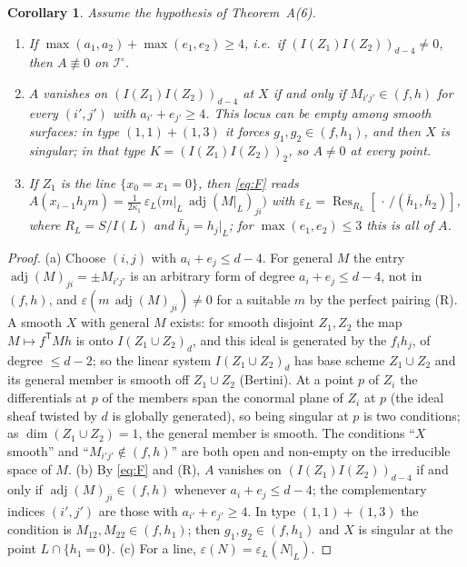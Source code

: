 \documentclass[11pt]{article}
\numberwithin{equation}{section}
\newtheorem{corollary}[theorem]{Corollary}
\theoremstyle{remark}
\newcommand{\cI}{\mathcal{I}}
\newcommand{\Res}{\operatorname{Res}}
\newcommand{\adj}{\operatorname{adj}}
\begin{document}
\begin{corollary}\label{cor:F}
Assume the hypothesis of Theorem~\textup{A(6)}.
\begin{enumerate}[label=\textup{(\alph*)}]
\item If $\max(a_1,a_2)+\max(e_1,e_2)\ge4$, i.e.\ if $(I(Z_1)I(Z_2))_{d-4}\neq0$, then $A\not\equiv0$ on
$\cI^\circ$.
\item $A$ vanishes on $(I(Z_1)I(Z_2))_{d-4}$ at $X$ if and only if $M_{i'j'}\in(f,h)$ for every $(i',j')$ with
$a_{i'}+e_{j'}\ge4$. This locus can be empty among smooth surfaces: in type $(1,1)+(1,3)$ it forces
$g_1,g_2\in(f,h_1)$, and then $X$ is singular; in that type $K=(I(Z_1)I(Z_2))_2$, so $A\neq0$ at every point.
\item If $Z_1$ is the line $\{x_0=x_1=0\}$, then \eqref{eq:F} reads
$A(x_{i-1}h_jm)=\frac1{2\kappa_1}\,\varepsilon_L\bigl(m|_L\,\adj(M|_L)_{ji}\bigr)$ with
$\varepsilon_L=\Res_{R_L}[\,\cdot\,/(\bar h_1,\bar h_2)]$, where $R_L=S/I(L)$ and $\bar h_j=h_j|_L$; for
$\max(e_1,e_2)\le3$ this is all of $A$.
\end{enumerate}
\end{corollary}
\begin{proof}
(a) Choose $(i,j)$ with $a_i+e_j\le d-4$. For general $M$ the entry $\adj(M)_{ji}=\pm M_{i'j'}$ is an arbitrary
form of degree $a_i+e_j\le d-4$, not in $(f,h)$, and $\varepsilon(m\,\adj(M)_{ji})\neq0$ for a suitable $m$ by
the perfect pairing (R). A smooth $X$ with general $M$ exists: for smooth disjoint $Z_1,Z_2$ the map
$M\mapsto f^{\mathsf T}Mh$ is onto $I(Z_1\cup Z_2)_d$, and this ideal is generated by the $f_ih_j$, of degree
$\le d-2$; so the linear system $I(Z_1\cup Z_2)_d$ has base scheme $Z_1\cup Z_2$ and its general member is smooth
off $Z_1\cup Z_2$ (Bertini). At a point $p$ of $Z_i$ the differentials at $p$ of the members span the conormal
plane of $Z_i$ at $p$ (the ideal sheaf twisted by $d$ is globally generated), so being singular at $p$ is two
conditions; as $\dim(Z_1\cup Z_2)=1$, the general member is smooth. The conditions ``$X$ smooth'' and
``$M_{i'j'}\notin(f,h)$'' are both open and non-empty on the irreducible space of $M$. (b) By \eqref{eq:F} and (R), $A$ vanishes on
$(I(Z_1)I(Z_2))_{d-4}$ if and only if $\adj(M)_{ji}\in(f,h)$ whenever $a_i+e_j\le d-4$; the complementary
indices $(i',j')$ are those with $a_{i'}+e_{j'}\ge4$. In type $(1,1)+(1,3)$ the condition is
$M_{12},M_{22}\in(f,h_1)$; then $g_1,g_2\in(f,h_1)$ and $X$ is singular at the point $L\cap\{h_1=0\}$.
(c) For a line, $\varepsilon(N)=\varepsilon_L(N|_L)$.
\end{proof}
\end{document}
